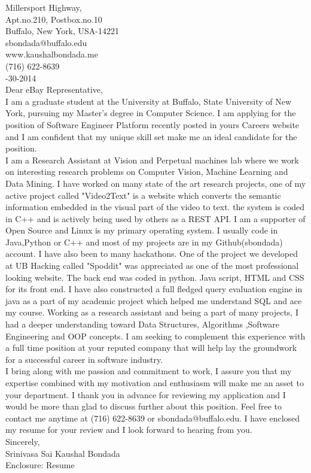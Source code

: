 \documentclass[10pt,letterpaper,oneside]{article}
\begin{document}
 Millersport Highway,\\
Apt.no.210, Postbox.no.10\\
Buffalo, New York, USA-14221\\
sbondada@buffalo.edu\\
www.kaushalbondada.me\\
(716) 622-8639\\

-30-2014\\
 
\noindent Dear eBay Representative,\\
 
I am a graduate student at the University at Buffalo, State University of New York, pursuing my Master's degree 
in Computer Science. I am applying for the position of Software Engineer Platform recently posted in yours Careers
website and I am confident that my unique skill set make me an ideal candidate for the position.\\

I am a Research Assistant at Vision and Perpetual machines lab where we work on interesting research problems on Computer
Vision, Machine Learning and Data Mining. I have worked on many state of the art research projects, one of my active project called
"Video2Text" is a website which converts the semantic information embedded in the visual part of the
video to text.
the system is coded in C++ and is actively being used by others as a REST API. I am a supporter of Open Source and Linux is my primary operating
system. I usually code in Java,Python or C++ and most of my projects are in my Github(sbondada) account. I have also been to many hackathons.
One of the project we developed at UB Hacking called "Spoddit" was appreciated as one of the most professional looking website. The back end
was coded in python. Java script, HTML and CSS for its front end. I have also constructed a
full fledged query evaluation engine in java as a part of my academic project which helped me
understand  SQL and ace my course. Working as a research assistant and being a part of many projects, I
had a deeper understanding toward Data Structures, Algorithms ,Software Engineering and OOP concepts. I am seeking to complement this experience with a full time position at your reputed company that will help lay the groundwork for a successful career in software industry.\\

I bring along with me passion and commitment to work, I assure you that my expertise combined with my motivation
and enthusiasm will make me an asset to your department. I thank you in advance for reviewing my application and I would be more than glad to
discuss further about this position. Feel free to contact me anytime at (716) 622-8639 or sbondada@buffalo.edu. I have enclosed my resume for your review and I look forward to hearing from you.\\
 
\noindent Sincerely,\\
Srinivasa Sai Kaushal Bondada\\
Enclosure: Resume\\
\end{document}
